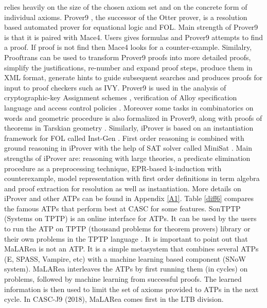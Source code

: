 relies heavily on the size of the chosen axiom set and on the concrete form of individual axioms.
Prover9 , the successor of the Otter prover, is a resolution based automated prover for equational logic and FOL. 
Main strength of Prover9 is that it is paired with Mace4. Users gives formulas and Prover9 attempts to find a proof. 
If proof is not find then Mace4 looks for a counter-example. Similalry, Prooftrans can be used to transform Prover9 proofs into more detailed proofs, 
simplify the justifications, re-number and expand proof steps, produce them in XML format, generate hints to guide subsequent searches and produces proofs for 
input to proof checkers such as IVY. 
Prover9 is used in the analysis of cryptographic-key Assignment schemes , verification of Alloy specification language 
 and access control policies . Moreover some tasks in combinatorics on words  and
geometric procedure  is  also formalized in Prover9, along with proofs of theorems in Tarskian geometry .
Similarly, iProver  is based on an instantiation framework for FOL called Inst-Gen .
First order reasoning is combined with ground reasoning in iProver with the help of SAT solver called MiniSat . 
Main strengths of iProver are: reasoning with large theories, a predicate elimination procedure as a preprocessing technique, 
EPR-based k-induction with counterexample, model representation with first order definitions in term algebra and 
proof extraction for resolution as well as instantiation. More details on iProver and other ATPs can be found in Appendix \ref{A1}.
Table \ref{diff6} compares the famous ATPs that perform best at CASC for some features. SonTPTP (Systems on TPTP) is an online interface for ATPs. It can be 
used by the users to run the ATP on TPTP (thousand problems for theorem provers) library or their own problems in the TPTP language . 
It is important to point out that MaLARea  is not an ATP. It is a simple metasystem that combines several ATPs (E, SPASS, Vampire, etc) 
with a machine learning based component (SNoW system).  MaLARea interleaves the ATPs by first running them (in cycles) on problems, followed by machine learning 
from successful proofs. The learned information is then used to limit the set of axioms provided to ATPs in the next cycle. In CASC-J9 (2018), 
MaLARea comes first in the LTB division. 
